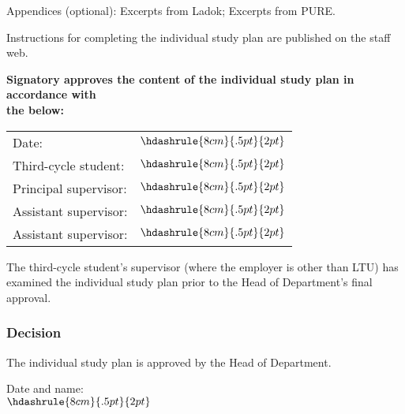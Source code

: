 \renewcommand{\arraystretch}{1.5}
\thispagestyle{fancy}
\pagestyle{fancy}
\fancyhead[L]{}
\fancyhead[R]{}
\renewcommand{\footrulewidth}{.5pt}
\renewcommand{\headrulewidth}{0pt}
\fancyfoot[R]{\thepage}
\maketitle
\tableofcontents
\noindent Appendices (optional): Excerpts from Ladok; Excerpts from PURE.

\noindent Instructions for completing the individual study plan are published on the staff web.

\noindent\textbf{Signatory approves the content of the individual study plan in accordance with}\\
\textbf{the below:}

\begin{minipage}{\textwidth}
\noindent\begin{tabular}{p{4cm}l}
Date:                 &  $\hdashrule{8cm}{.5pt}{2pt}$ \\
Third-cycle student:  &  $\hdashrule{8cm}{.5pt}{2pt}$ \\
Principal supervisor: &  $\hdashrule{8cm}{.5pt}{2pt}$ \\
Assistant supervisor: &  $\hdashrule{8cm}{.5pt}{2pt}$ \\
Assistant supervisor: &  $\hdashrule{8cm}{.5pt}{2pt}$ \\
\end{tabular}
\end{minipage}

\vspace*{.5\baselineskip}
\uncheckedbox The third-cycle student's supervisor (where the employer is other than LTU) has examined the individual study plan prior to the Head of Department's final approval.

\subsubsection*{Decision}
The individual study plan is approved by the Head of Department.

Date and name:\\[.5\baselineskip]

$\hdashrule{8cm}{.5pt}{2pt}$

\renewcommand{\arraystretch}{1.2}
\clearpage

